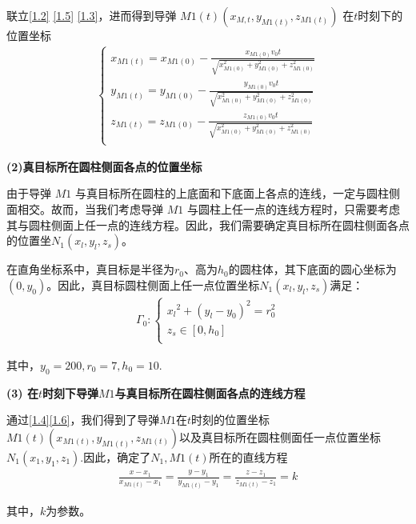 \documentclass[../main.tex]{subfiles}
\begin{document}
\par 联立\eqref{1.2} \eqref{1.5} \eqref{1.3}，进而得到导弹 \( M1(t)(x_{M,t}, y_{M1(t)}, z_{M1(t)}) \) 在$t$时刻下的位置坐标
\begin{align}\label{1.4}
\left\{ \begin{array}{l}
x_{M1(t)}=x_{M1(0)}-\frac{x_{M1(0)}v_0t}{\sqrt{x_{M1(0)}^{2}+y_{M1(0)}^{2}+z_{M1(0)}^{2}}}\\
y_{M1(t)}=y_{M1(0)}-\frac{y_{M1(0)}v_0t}{\sqrt{x_{M1(0)}^{2}+y_{M1(0)}^{2}+z_{M1(0)}^{2}}}\\
z_{M1(t)}=z_{M1(0)}-\frac{z_{M1(0)}v_0t}{\sqrt{x_{M1(0)}^{2}+y_{M1(0)}^{2}+z_{M1(0)}^{2}}}\\
\end{array} \right. 
\end{align}


\noindent\textbf{(2)真目标所在圆柱侧面各点的位置坐标}
\par 由于导弹 \( M1 \) 与真目标所在圆柱的上底面和下底面上各点的连线，一定与圆柱侧面相交。故而，当我们考虑导弹 \( M1 \) 与圆柱上任一点的连线方程时，只需要考虑其与圆柱侧面上任一点的连线方程。因此，我们需要确定真目标所在圆柱侧面各点的位置坐$N_1\left( x_l,y_l,z_s \right) $。
\par 在直角坐标系中，真目标是半径为$r_0$、高为$h_0$的圆柱体，其下底面的圆心坐标为$\left( 0,y_0 \right)$。因此，真目标圆柱侧面上任一点位置坐标$N_1\left( x_l,y_l,z_s \right) $满足：
\begin{align}\label{1.6}
\varGamma _0:\begin{cases}
{x_l}^2+\left( y_l-y_0 \right) ^2=r_{0}^{2}\\
z_s\in \left[ 0,h_0 \right]\\
\end{cases}
\end{align}
\par 其中，$y_0=200,r_0=7,h_0=10$.




\noindent\textbf{(3) 在\( t \)时刻下导弹\( M1 \)与真目标所在圆柱侧面各点的连线方程}
\par 通过\eqref{1.4}\eqref{1.6}，我们得到了导弹$M1$在\( t \)时刻的位置坐标\( M1(t)(x_{M1(t)}, y_{M1(t)}, z_{M1(t)}) \)以及真目标所在圆柱侧面任一点位置坐标$N_1\left( x_1,y_1,z_1 \right) $.因此，确定了$N_1,M1(t)$所在的直线方程
\begin{align}\label{1.7}
\frac{x-x_1}{x_{M1(t)}-x_1}=\frac{y-y_1}{y_{M1(t)}-y_1}=\frac{z-z_1}{z_{M1(t)}-z_1}=k 
\end{align}
\par 其中，$k$为参数。
\end{document}

